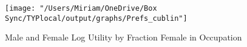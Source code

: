 \documentclass[12pt]{article}
\begin{document}
%
%

\begin{figure}[H]
\caption{Male and Female Log Utility by Fraction Female in Occupation}
\label{prefs}
\begin{center}
\texttt{[image: "/Users/Miriam/OneDrive/Box Sync/TYPlocal/output/graphs/Prefs\_cublin"]}
\end{center}
\end{figure}


\end{document}
